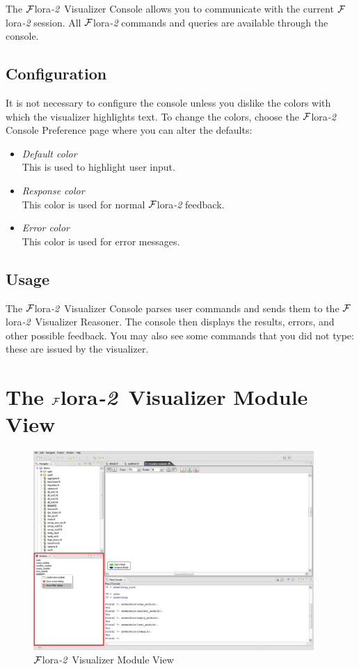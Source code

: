 \documentclass[a4paper,11pt]{article}
\newcommand{\FLORA}{{\mbox{\sc ${\cal F}${lora}\rm\emph{-2}}}\xspace}
\newcommand{\FVIZ}{{\mbox{\sc ${\cal F}${lora}\rm\emph{-2} {Visualizer}}}\xspace}
\begin{document}
The \FVIZ Console allows you to communicate with the current \FLORA session.
All \FLORA commands and queries are available through the console.

\subsection{Configuration}
\label{sec:consoleview_configuration}

It is not necessary to configure the console unless you dislike the colors
with which the visualizer highlights text. To change the colors, choose
the \FLORA Console Preference page where you can alter the defaults:
\begin{itemize}
\item \emph{Default color}  \\
This is used to highlight user input.
\item \emph{Response color}  \\
  This color is used for normal \FLORA feedback.
\item \emph{Error color} \\
  This color is used for error messages.
\end{itemize}

\subsection{Usage}
\label{sec:consoleview_usage}

The \FVIZ Console 
parses user commands and sends them to the \FVIZ Reasoner.
The console then displays the results, errors, and other possible feedback.
You may also see some commands that you did not type: these are
issued by the visualizer.

\section{The \FVIZ Module View}
\label{sec:moduleview}

\begin{figure}[tbh]
	\centering
		\includegraphics[width=0.95\textwidth]{fviz_module}
	\caption{\FVIZ Module View}
	\label{fig:fviz_module}
\end{figure}
\end{document}
